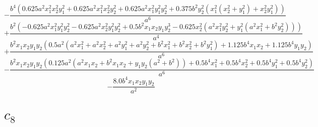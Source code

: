 $$- \frac{b^{4} \left(0.625 a^{2} x_{1}^{2} x_{2}^{2} y_{1}^{2} + 0.625 a^{2} x_{1}^{2} x_{2}^{2} y_{2}^{2} + 0.625 a^{2} x_{1}^{2} y_{1}^{2} y_{2}^{2} + 0.375 b^{2} y_{2}^{2} \left(x_{1}^{2} \left(x_{2}^{2} + y_{1}^{2}\right) + x_{2}^{2} y_{1}^{2}\right)\right)}{a^{6}}$$
$$+\frac{b^{2} \left(- 0.625 a^{2} x_{1}^{2} y_{1}^{2} y_{2}^{2} - 0.625 a^{2} x_{2}^{2} y_{1}^{2} y_{2}^{2} + 0.5 b^{2} x_{1} x_{2} y_{1} y_{2}^{3} - 0.625 x_{2}^{2} \left(a^{2} x_{1}^{2} y_{2}^{2} + y_{1}^{2} \left(a^{2} x_{1}^{2} + b^{2} y_{2}^{2}\right)\right)\right)}{a^{4}}$$
$$+\frac{b^{2} x_{1} x_{2} y_{1} y_{2} \left(0.5 a^{2} \left(a^{2} x_{1}^{2} + a^{2} x_{2}^{2} + a^{2} y_{1}^{2} + a^{2} y_{2}^{2} + b^{2} x_{1}^{2} + b^{2} x_{2}^{2} + b^{2} y_{1}^{2}\right) + 1.125 b^{4} x_{1} x_{2} + 1.125 b^{4} y_{1} y_{2}\right)}{a^{6}}$$
$$- \frac{b^{2} x_{1} x_{2} y_{1} y_{2} \left(0.125 a^{2} \left(a^{2} x_{1} x_{2} + b^{2} x_{1} x_{2} + y_{1} y_{2} \left(a^{2} + b^{2}\right)\right) + 0.5 b^{4} x_{1}^{2} + 0.5 b^{4} x_{2}^{2} + 0.5 b^{4} y_{1}^{2} + 0.5 b^{4} y_{2}^{2}\right)}{a^{6}}$$
$$- \frac{8.0 b^{4} x_{1} x_{2} y_{1} y_{2}}{a^{2}}$$


\section{$c_8$}

